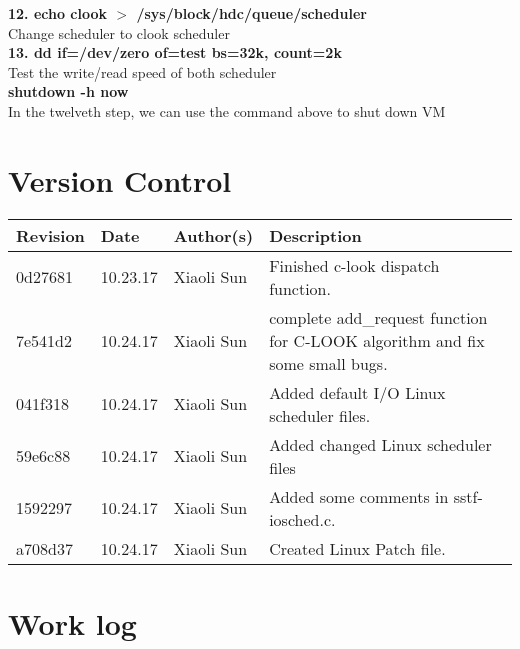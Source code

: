 \documentclass[10pt,letterpaper]{article}
\begin{document}
\textbf{12. echo clook $>$ /sys/block/hdc/queue/scheduler}\\
Change scheduler to clook scheduler\\

\textbf{13. dd if=/dev/zero of=test bs=32k, count=2k}\\
Test the write/read speed of both scheduler\\

\textbf{shutdown -h now}\\
In the twelveth step, we can use the command above to shut down VM\\

\section{Version Control}

\textbf{}

\begin{tabular}{|l|l|l|p{8cm}|} \hline
Revision & Date & Author(s) & Description\\ \hline
0d27681 & 10.23.17 & Xiaoli Sun & Finished c-look dispatch function.\\ \hline
7e541d2 & 10.24.17 & Xiaoli Sun & complete add\_request function for C-LOOK algorithm and fix some small bugs.\\ \hline
041f318 & 10.24.17 & Xiaoli Sun & Added default I/O Linux scheduler files.\\ \hline
59e6c88 & 10.24.17 & Xiaoli Sun & Added changed Linux scheduler files\\ \hline
1592297 & 10.24.17 & Xiaoli Sun & Added some comments in sstf-iosched.c.\\ \hline
a708d37 & 10.24.17 & Xiaoli Sun & Created Linux Patch file.\\ \hline

\end{tabular}

\section{Work log}

\textbf{}
\end{document}
